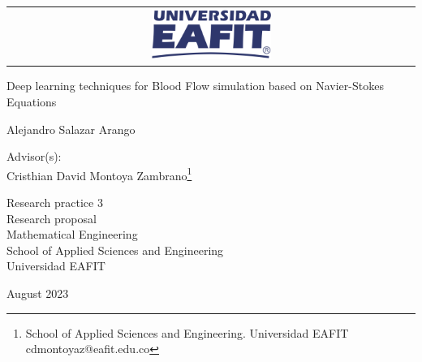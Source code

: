 \documentclass[12pt,letterpaper]{article}
\begin{document}
\begin{titlepage}

\Large
\sffamily

\begin{center}
  \begin{tabular}{c}
    \includegraphics[width=0.30\textwidth]{logo-eafit.png}
  \end{tabular}
\end{center}

\vfill
\begin{center}
  \LARGE Deep learning techniques for Blood Flow simulation based on Navier-Stokes Equations
\end{center}

\vspace*{1cm}
\centerline{\LARGE Alejandro Salazar Arango\footnotemark}  
\vfill

\begin{center}
Advisor(s): \\
Cristhian David Montoya Zambrano\footnote{School of Applied Sciences and Engineering. Universidad EAFIT cdmontoyaz@eafit.edu.co}   \\
\end{center}

\vfill

\begin{center}
  \large
    Research practice 3 \\
  Research proposal \\
  Mathematical Engineering\\
  School of Applied Sciences and Engineering\\
  Universidad EAFIT \\
\end{center}

\vfill
\centerline{August 2023}
\vspace*{0.7cm}
\end{titlepage}

\end{document}
